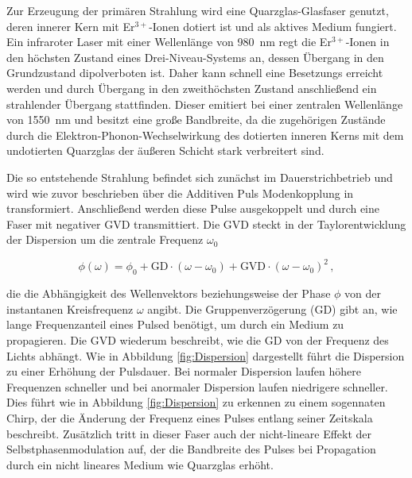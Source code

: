      Zur Erzeugung der primären Strahlung wird eine Quarzglas-Glasfaser genutzt, deren innerer Kern mit Er$^{3+}$-Ionen dotiert ist und als aktives Medium fungiert. Ein infraroter Laser mit einer Wellenlänge von 
      \SI{980}{\nano\metre} regt die Er$^{3+}$-Ionen in den höchsten Zustand eines Drei-Niveau-Systems an, dessen Übergang in den Grundzustand dipolverboten ist. Daher kann schnell eine Besetzungs erreicht 
      werden und durch Übergang in den zweithöchsten Zustand anschließend ein strahlender Übergang stattfinden. Dieser emitiert bei einer zentralen Wellenlänge von \SI{1550}{\nano\metre} und besitzt eine 
      große Bandbreite, da die zugehörigen Zustände durch die Elektron-Phonon-Wechselwirkung des dotierten inneren Kerns mit dem undotierten Quarzglas der äußeren Schicht stark verbreitert sind.
      
      Die so entstehende Strahlung befindet sich zunächst im Dauerstrichbetrieb und wird wie zuvor beschrieben über die Additiven Puls Modenkopplung in transformiert. Anschließend werden diese Pulse 
      ausgekoppelt und durch eine Faser mit negativer GVD transmittiert. Die GVD steckt in der Taylorentwicklung der Dispersion um die zentrale Frequenz $\omega_0$
      
      \begin{equation}
        \phi(\omega) = \phi_0 + \text{GD} \cdot \left(\omega-\omega_0\right) + \text{GVD} \cdot \left(\omega-\omega_0\right)^2 \,,
      \end{equation}
      
      die die Abhängigkeit des Wellenvektors beziehungsweise der Phase $\phi$ von der instantanen Kreisfrequenz $\omega$ angibt. Die Gruppenverzögerung (GD) gibt an, wie lange Frequenzanteil eines Pulsed 
      benötigt, um durch ein Medium zu propagieren. Die GVD wiederum beschreibt, wie die GD von der Frequenz des Lichts abhängt. Wie in Abbildung \ref{fig:Dispersion} dargestellt führt die Dispersion zu
      einer Erhöhung der Pulsdauer. Bei normaler Dispersion laufen höhere Frequenzen schneller und bei anormaler Dispersion laufen niedrigere schneller. Dies führt wie in Abbildung \ref{fig:Dispersion} zu
      erkennen zu einem sogennaten Chirp, der die Änderung der Frequenz eines Pulses entlang seiner Zeitskala beschreibt. Zusätzlich tritt in dieser Faser auch der nicht-lineare Effekt der 
      Selbstphasenmodulation auf, der die Bandbreite des Pulses bei Propagation durch ein nicht lineares Medium wie Quarzglas erhöht.
  

